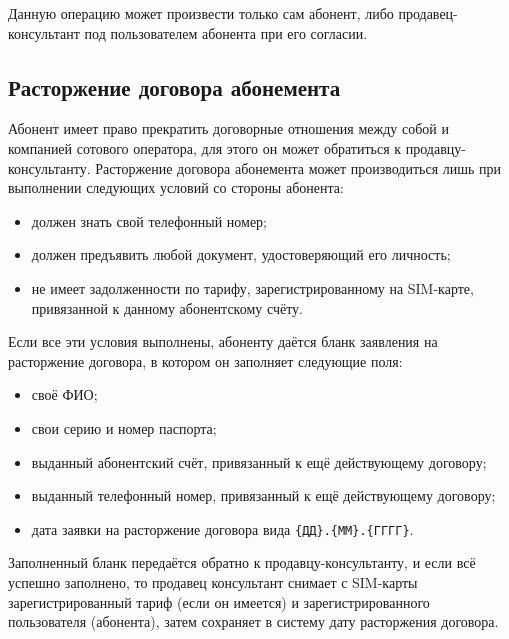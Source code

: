 Данную операцию может произвести только сам абонент, либо продавец-консультант под пользователем абонента при его согласии.


\subsection{Расторжение договора абонемента}


Абонент имеет право прекратить договорные отношения между собой и компанией сотового оператора, для этого он может обратиться к продавцу-консультанту. Расторжение договора абонемента может производиться лишь при выполнении следующих условий со стороны абонента:
\begin{itemize}
    \item должен знать свой телефонный номер;
    \item должен предъявить любой документ, удостоверяющий его личность;
    \item не имеет задолженности по тарифу, зарегистрированному на SIM-карте, привязанной к данному абонентскому счёту.
\end{itemize} 

Если все эти условия выполнены, абоненту даётся бланк заявления на расторжение договора, в котором он заполняет следующие поля:
\begin{itemize}
    \item своё ФИО;
    \item свои серию и номер паспорта;
    \item выданный абонентский счёт, привязанный к ещё действующему договору;
    \item выданный телефонный номер, привязанный к ещё действующему договору;
    \item дата заявки на расторжение договора вида \texttt{\{ДД\}.\{ММ\}.\{ГГГГ\}}.
\end{itemize}

Заполненный бланк передаётся обратно к продавцу-консультанту, и если всё успешно заполнено, то продавец консультант снимает с SIM-карты зарегистрированный тариф (если он имеется) и зарегистрированного пользователя (абонента), затем сохраняет в систему дату расторжения договора.




